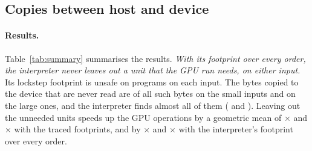 \documentclass[11pt]{article}
\newcommand{\tabref}[1]{Table~\ref{#1}}
\begin{document}
\subsection{Copies between host and device}
\label{sec:eval-copies}

\begin{table}[tbp]
\centering
\scriptsize
\setlength{\tabcolsep}{3pt}

\caption{Copies between host and device with each footprint: the share of the bytes copied to the device that are
unread and of the bytes copied to the host that are unwritten, the geometric-mean speedup of all GPU operations from
leaving them out, the programs that save at least 1\% of their GPU operation time, and the programs on which the
footprint marks a unit as not needed that the traced run needs.}
\label{tab:summary}
\end{table}

\paragraph{Results.} \tabref{tab:summary} summarises the results. \textit{With its footprint over every order, the
interpreter never leaves out a unit that the GPU run needs, on either input.} Its lockstep footprint is unsafe on
\numSmallLockUnsafeProgs{} programs on each input. The bytes copied to the device that are never read are
\numSmallTrHtoDUnneeded{} of all such bytes on the small inputs and \numLargeTrHtoDUnneeded{} on the large ones, and
the interpreter finds almost all of them (\numSmallHyHtoDUnneeded{} and \numLargeHyHtoDUnneeded{}). Leaving out the
unneeded units speeds up the GPU operations by a geometric mean of \numSmallTrGeo{}$\times$ and
\numLargeTrGeo{}$\times$ with the traced footprints, and by \numSmallHyGeo{}$\times$ and \numLargeHyGeo{}$\times$
with the interpreter's footprint over every order.

\begin{table}[tbp]
\centering
\scriptsize
\setlength{\tabcolsep}{3pt}

\caption{The programs whose traced footprints save at least 1\% of their GPU operation time on either input: the
share of that time spent in copies, and the share saved with each footprint (\%).}
\label{tab:programs}
\end{table}
\end{document}
